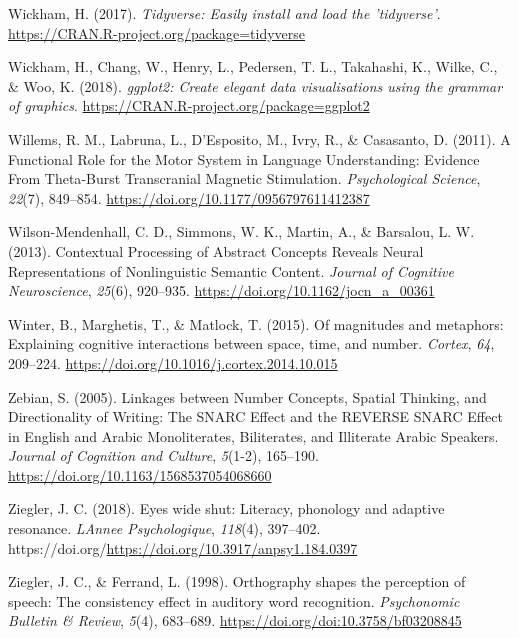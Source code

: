 \documentclass[
  a4paper,12pt,twoside,onecolumn,openright,final,oldfontcommands]{memoir}
\newlength{\cslhangindent}
\newlength{\cslentryspacingunit} %
\newenvironment{CSLReferences}[2] %
 {%
  \setlength{\parindent}{0pt}
  \ifodd #1
  \let\oldpar\par
  \def\par{\hangindent=\cslhangindent\oldpar}
  \fi
  \setlength{\parskip}{#2\cslentryspacingunit}
 }%
 {}
\begin{document}
\begin{CSLReferences}{1}{0}
\leavevmode{}%
Wickham, H. (2017). \emph{Tidyverse: Easily install and load the 'tidyverse'}. \url{https://CRAN.R-project.org/package=tidyverse}

\leavevmode{}%
Wickham, H., Chang, W., Henry, L., Pedersen, T. L., Takahashi, K., Wilke, C., \& Woo, K. (2018). \emph{ggplot2: Create elegant data visualisations using the grammar of graphics}. \url{https://CRAN.R-project.org/package=ggplot2}

\leavevmode{}%
Willems, R. M., Labruna, L., D'Esposito, M., Ivry, R., \& Casasanto, D. (2011). A {Functional} {Role} for the {Motor} {System} in {Language} {Understanding}: {Evidence} {From} {Theta}-{Burst} {Transcranial} {Magnetic} {Stimulation}. \emph{Psychological Science}, \emph{22}(7), 849--854. \url{https://doi.org/10.1177/0956797611412387}

\leavevmode{}%
Wilson-Mendenhall, C. D., Simmons, W. K., Martin, A., \& Barsalou, L. W. (2013). Contextual {Processing} of {Abstract} {Concepts} {Reveals} {Neural} {Representations} of {Nonlinguistic} {Semantic} {Content}. \emph{Journal of Cognitive Neuroscience}, \emph{25}(6), 920--935. \url{https://doi.org/10.1162/jocn_a_00361}

\leavevmode{}%
Winter, B., Marghetis, T., \& Matlock, T. (2015). Of magnitudes and metaphors: {Explaining} cognitive interactions between space, time, and number. \emph{Cortex}, \emph{64}, 209--224. \url{https://doi.org/10.1016/j.cortex.2014.10.015}

\leavevmode{}%
Zebian, S. (2005). Linkages between {Number} {Concepts}, {Spatial} {Thinking}, and {Directionality} of {Writing}: {The} {SNARC} {Effect} and the {REVERSE} {SNARC} {Effect} in {English} and {Arabic} {Monoliterates}, {Biliterates}, and {Illiterate} {Arabic} {Speakers}. \emph{Journal of Cognition and Culture}, \emph{5}(1-2), 165--190. \url{https://doi.org/10.1163/1568537054068660}

\leavevmode{}%
Ziegler, J. C. (2018). Eyes wide shut: Literacy, phonology and adaptive resonance. \emph{LAnnee Psychologique}, \emph{118}(4), 397--402. https://doi.org/\url{https://doi.org/10.3917/anpsy1.184.0397}

\leavevmode{}%
Ziegler, J. C., \& Ferrand, L. (1998). Orthography shapes the perception of speech: {The} consistency effect in auditory word recognition. \emph{Psychonomic Bulletin \& Review}, \emph{5}(4), 683--689. \url{https://doi.org/doi:10.3758/bf03208845}


\end{CSLReferences}
\end{document}
